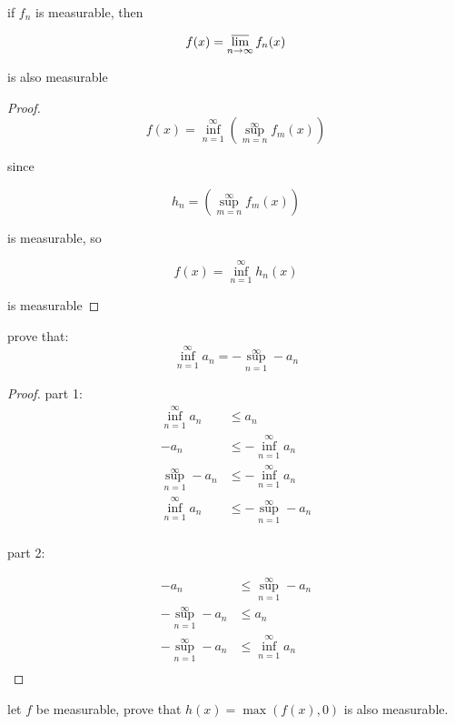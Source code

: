 \documentclass[11pt,a4paper]{article}
\begin{document}
\begin{exercise}
    if $f_n$ is measurable, then 

    \[
        f(x) = \varlimsup_{n \to \infty}f_n(x)
    \]

    is also measurable
\end{exercise}

\begin{proof}
    
    \[
        f(x) = \inf_{n=1}^{\infty} \left( \sup_{m=n}^{\infty} f_m(x) \right)
    \]

    since

    \[
        h_n = \left( \sup_{m=n}^{\infty} f_m(x) \right)
    \]

    is measurable, so

    \[
        f(x) = \inf_{n=1}^{\infty} h_n(x)
    \]

    is measurable
\end{proof}

\begin{exercise}
    prove that:
    \[
        \inf_{n=1}^{\infty} a_n = - \sup_{n=1}^{\infty}-a_n
    \]
\end{exercise}

\begin{proof}
    part 1:
    \begin{align*}
        \inf_{n=1}^{\infty} a_n &\le a_n \\
        -a_n & \le -\inf_{n=1}^{\infty} a_n \\
        \sup_{n=1}^{\infty} - a_n & \le -\inf_{n=1}^{\infty} a_n \\
        \inf_{n=1}^{\infty} a_n & \le -\sup_{n=1}^{\infty} - a_n\\
    \end{align*}

    part 2:

    \begin{align*}
        -a_n &\le \sup_{n=1}^{\infty}-a_n \\
-\sup_{n=1}^{\infty}-a_n & \le a_n \\
-\sup_{n=1}^{\infty}-a_n & \le \inf_{n=1}^{\infty}a_n \\
    \end{align*}
\end{proof}

\begin{exercise}
    let $f$ be measurable, prove that $h(x) = \max (f(x), 0)$ is also measurable.
\end{exercise}
\end{document}
